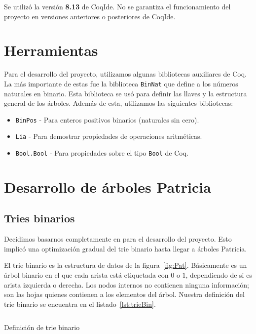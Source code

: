 \documentclass[11pt,letterpaper]{article}
\begin{document}
Se utilizó la versión \textbf{8.13} de CoqIde. No se garantiza el funcionamiento del proyecto en versiones anteriores o posteriores de CoqIde.

\section{Herramientas}

\noindent Para el desarrollo del proyecto, utilizamos algunas bibliotecas auxiliares de Coq. La más importante de estas fue la biblioteca \texttt{BinNat}\cite{noauthor_standard_nodate} que define a los números naturales en binario. Esta biblioteca se usó para definir las llaves y la estructura general de los árboles. Además de esta, utilizamos las siguientes bibliotecas:
\begin{itemize}
\item \texttt{BinPos} - Para enteros positivos binarios (naturales sin cero).
\item \texttt{Lia} - Para demostrar propiedades de operaciones aritméticas.
\item \texttt{Bool.Bool} - Para propiedades sobre el tipo \texttt{Bool} de Coq.
\end{itemize}

\section{Desarrollo de árboles Patricia}\label{section:desarrollo}

\subsection{Tries binarios}

\noindent Decidimos basarnos completamente en\cite{okasaki_fast_1998} para el desarrollo del proyecto. Esto implicó una optimización gradual del trie binario hasta llegar a árboles Patricia.

El trie binario es la estructura de datos de la figura~\ref{fig:Pat}. Básicamente es un árbol binario en el que cada arista está etiquetada con $0$ o $1$, dependiendo de si es arista izquierda o derecha. Los nodos internos no contienen ninguna información; son las hojas quienes contienen a los elementos del árbol. Nuestra definición del trie binario se encuentra en el listado~\ref{lst:trieBin}.

\begin{listing}[H]
  \inputminted{coq}{src/trie.v}
  \caption{Definición de trie binario}
  \label{lst:trieBin}
\end{listing}
\end{document}
